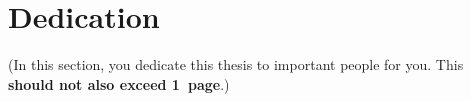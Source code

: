 \chapter*{Dedication}

(In this section, you dedicate this thesis to important people for you. This \textbf{should not also exceed 1~page}.)